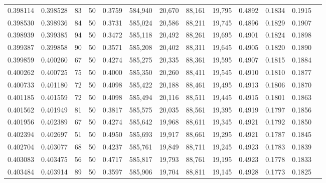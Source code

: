 \begin{tabular}{rrrrrrrrrrrrr}
0.398114 & 0.398528 &    83 &  50 &                                     0.3759 & 584,940 &  20,670 &  88,161 &  19,795 & 0.4892 & 0.1834 & 0.1915 \\
0.398530 & 0.398936 &    84 &  50 &                                     0.3731 & 585,024 &  20,586 &  88,211 &  19,745 & 0.4896 & 0.1829 & 0.1907 \\
0.398939 & 0.399385 &    94 &  50 &                                     0.3472 & 585,118 &  20,492 &  88,261 &  19,695 & 0.4901 & 0.1824 & 0.1898 \\
0.399387 & 0.399858 &    90 &  50 &                                     0.3571 & 585,208 &  20,402 &  88,311 &  19,645 & 0.4905 & 0.1820 & 0.1890 \\
0.399859 & 0.400260 &    67 &  50 &                                     0.4274 & 585,275 &  20,335 &  88,361 &  19,595 & 0.4907 & 0.1815 & 0.1884 \\
0.400262 & 0.400725 &    75 &  50 &                                     0.4000 & 585,350 &  20,260 &  88,411 &  19,545 & 0.4910 & 0.1810 & 0.1877 \\
0.400733 & 0.401180 &    72 &  50 &                                     0.4098 & 585,422 &  20,188 &  88,461 &  19,495 & 0.4913 & 0.1806 & 0.1870 \\
0.401185 & 0.401559 &    72 &  50 &                                     0.4098 & 585,494 &  20,116 &  88,511 &  19,445 & 0.4915 & 0.1801 & 0.1863 \\
0.401562 & 0.401949 &    81 &  50 &                                     0.3817 & 585,575 &  20,035 &  88,561 &  19,395 & 0.4919 & 0.1797 & 0.1856 \\
0.401956 & 0.402389 &    67 &  50 &                                     0.4274 & 585,642 &  19,968 &  88,611 &  19,345 & 0.4921 & 0.1792 & 0.1850 \\
0.402394 & 0.402697 &    51 &  50 &                                     0.4950 & 585,693 &  19,917 &  88,661 &  19,295 & 0.4921 & 0.1787 & 0.1845 \\
0.402704 & 0.403077 &    68 &  50 &                                     0.4237 & 585,761 &  19,849 &  88,711 &  19,245 & 0.4923 & 0.1783 & 0.1839 \\
0.403083 & 0.403475 &    56 &  50 &                                     0.4717 & 585,817 &  19,793 &  88,761 &  19,195 & 0.4923 & 0.1778 & 0.1833 \\
0.403484 & 0.403914 &    89 &  50 &                                     0.3597 & 585,906 &  19,704 &  88,811 &  19,145 & 0.4928 & 0.1773 & 0.1825 \\

\end{tabular}
